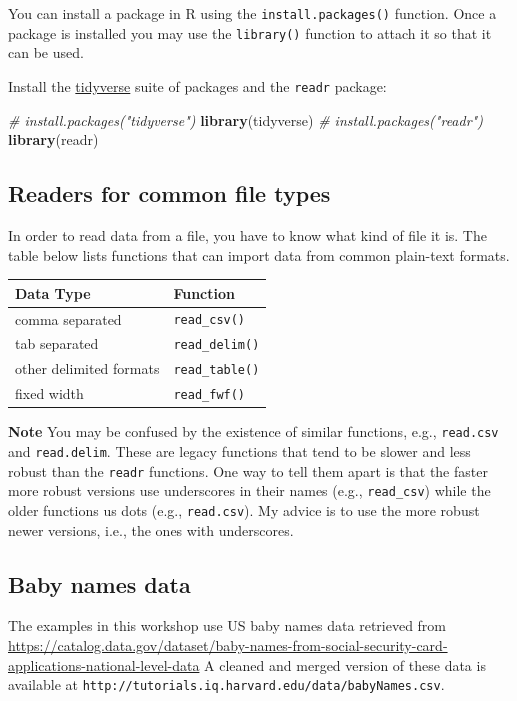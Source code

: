 \documentclass[]{book}
\newenvironment{Shaded}{\begin{snugshade}}{\end{snugshade}}
\newcommand{\KeywordTok}[1]{\textcolor[rgb]{0.13,0.29,0.53}{\textbf{#1}}}
\newcommand{\CommentTok}[1]{\textcolor[rgb]{0.56,0.35,0.01}{\textit{#1}}}
\newcommand{\NormalTok}[1]{#1}
\begin{document}
You can install a package in R using the \texttt{install.packages()}
function. Once a package is installed you may use the \texttt{library()}
function to attach it so that it can be used.

Install the \href{https://www.tidyverse.org/}{tidyverse} suite of
packages and the \texttt{readr} package:

\begin{Shaded}
\begin{Highlighting}[]
\CommentTok{# install.packages("tidyverse")}
\KeywordTok{library}\NormalTok{(tidyverse)}
\CommentTok{# install.packages("readr")}
\KeywordTok{library}\NormalTok{(readr)}
\end{Highlighting}
\end{Shaded}

\subsection{Readers for common file
types}\label{readers-for-common-file-types}

In order to read data from a file, you have to know what kind of file it
is. The table below lists functions that can import data from common
plain-text formats.

\begin{longtable}[]{@{}ll@{}}
\toprule
Data Type & Function\tabularnewline
\midrule
\endhead
comma separated & \texttt{read\_csv()}\tabularnewline
tab separated & \texttt{read\_delim()}\tabularnewline
other delimited formats & \texttt{read\_table()}\tabularnewline
fixed width & \texttt{read\_fwf()}\tabularnewline
\bottomrule
\end{longtable}

\textbf{Note} You may be confused by the existence of similar functions,
e.g., \texttt{read.csv} and \texttt{read.delim}. These are legacy
functions that tend to be slower and less robust than the \texttt{readr}
functions. One way to tell them apart is that the faster more robust
versions use underscores in their names (e.g., \texttt{read\_csv}) while
the older functions us dots (e.g., \texttt{read.csv}). My advice is to
use the more robust newer versions, i.e., the ones with underscores.

\subsection{Baby names data}\label{baby-names-data}

The examples in this workshop use US baby names data retrieved from
\url{https://catalog.data.gov/dataset/baby-names-from-social-security-card-applications-national-level-data}
A cleaned and merged version of these data is available at
\texttt{http://tutorials.iq.harvard.edu/data/babyNames.csv}.
\end{document}
